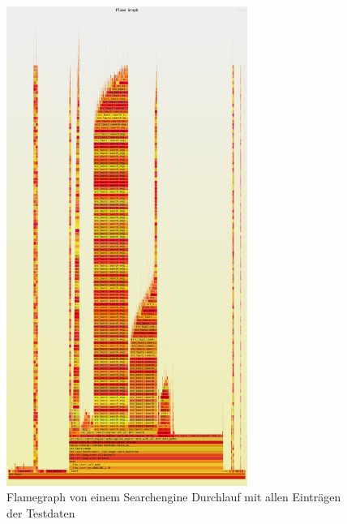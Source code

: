 \begin{figure}[htbp]
  \centering
  \includegraphics[width=0.7\textwidth]{./flamegraphs/test_with_all_test_paths.png}
  \caption{Flamegraph von einem Searchengine Durchlauf mit allen Einträgen der Testdaten}
  \label{fig:second_flame_graph}
\end{figure}
